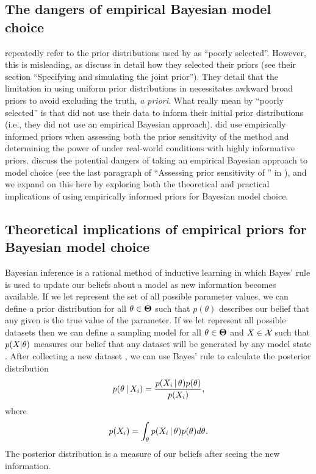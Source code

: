 \documentclass[letterpaper,12pt]{article}
\begin{document}
\begin{linenumbers}
\section*{The dangers of empirical Bayesian model choice}
\citet{Hickerson2013} repeatedly refer to the prior distributions used by
\citet{Oaks2012} as ``poorly selected''. 
However, this is misleading, as \citet{Oaks2012} discuss in detail how they
selected their priors (see their section ``Specifying and simulating the joint
prior'').
They detail that the limitation in using uniform prior distributions in \msb
necessitates awkward broad priors to avoid excluding the truth, \textit{a
    priori}.
What \citet{Hickerson2013} really mean by ``poorly selected'' is that
\citet{Oaks2012} did not use their data to inform their initial prior
distributions (i.e., they did not use an empirical Bayesian approach).
\citet{Oaks2012} did use empirically informed priors when assessing both the
prior sensitivity of the method and determining the power of \msb under
real-world conditions with highly informative priors.  
\citet{Oaks2012} discuss
the potential dangers of taking an empirical Bayesian approach to model choice
(see the last paragraph of ``Assessing prior sensitivity of \msb'' in
\citet{Oaks2012}), and we expand on this here by exploring both the theoretical
and practical implications of using empirically informed priors for Bayesian
model choice.

\subsection*{Theoretical implications of empirical priors for Bayesian model
choice}
\begin{linenomath}
Bayesian inference is a rational method of inductive learning in which Bayes'
rule is used to update our beliefs about a model as new information becomes
available.
If we let \allParameterValues represent the set of all possible parameter
values, we can define a prior distribution for all $\theta \in
\boldsymbol{\Theta}$ such that $p(\theta)$ describes our belief that any given
\myTheta{} is the true value of the parameter.
If we let \allDatasets represent all possible datasets then we can 
define a sampling model for all $\theta \in
\boldsymbol{\Theta}$ and $\alignment{}{} \in \allDatasets$ such that
$p(\alignment{}{} | \theta)$ measures our belief that any dataset \alignment{}{}
will be generated by any model state \myTheta{}.
After collecting a new dataset , we can use Bayes' rule to
calculate the posterior distribution
\begin{equation}
    p(\myTheta{} \given \alignment{i}{}) = \frac{p(\alignment{i}{} \given 
    \myTheta{})p(\myTheta{})}{p(\alignment{i}{})},
    \label{eq:bayesrule}
\end{equation}
where
\begin{equation}
    p(\alignment{i}{}) = \int_{\myTheta{}} p(\alignment{i}{} \given
    \myTheta{})p(\myTheta{}) d\myTheta{}.
\end{equation}
The posterior distribution is a measure of our beliefs after seeing the new
information.
\end{linenomath}


\end{linenumbers}
\end{document}
